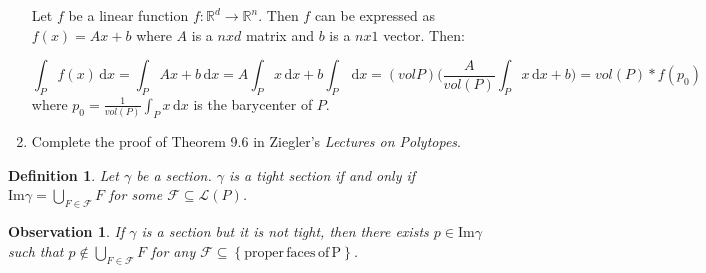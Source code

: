 \documentclass[12pt,a4paper]{article}
\newtheorem*{defi}{Definition}
\newtheorem*{obs}{Observation}
\begin{document}
\begin{enumerate}
  Let $f$ be a linear function $f:\mathbb{R}^d\longrightarrow\mathbb{R}^n$.
  Then $f$ can be expressed as $f(x)=Ax+b$ where $A$ is a $nxd$ matrix and $b$ is a $nx1$ vector. Then:
  
  \begin{equation*}
       \int_P f(x)\,\text{d}x= \int_P Ax+b\,\text{d}x = A\int_P x\,\text{d}x + b\int_P \,\text{d}x =  (vol P) \bigg(\frac{A}{vol(P)}\int_P x\,\text{d}x + b\bigg) = vol(P)*f(p_0)
  \end{equation*}
  where $p_0 = \frac{1}{vol(P)}\int_P x\,\text{d}x$ is the barycenter of $P$.
  \bigskip
\item Complete the proof of Theorem 9.6 in Ziegler's \emph{Lectures on Polytopes}.
  
\end{enumerate}
\begin{defi}
Let $\gamma$ be a section. $\gamma$ is a tight section if and only if $\mathrm{Im}\gamma=\bigcup_{F\in\mathcal{F}}F$ for some $\mathcal{F}\subseteq\mathcal{L}\left(P\right)$.
\end{defi}
\begin{obs}
If $\gamma$ is a section but it is not tight, then there exists $p\in\mathrm{Im}\gamma$ such that $p\not\in\bigcup_{F\in\mathcal{F}}F$ for any $\mathcal{F}\subseteq\left\lbrace\mathrm{proper\,faces\,of\,P}\right\rbrace$.
\end{obs}

\end{document}
